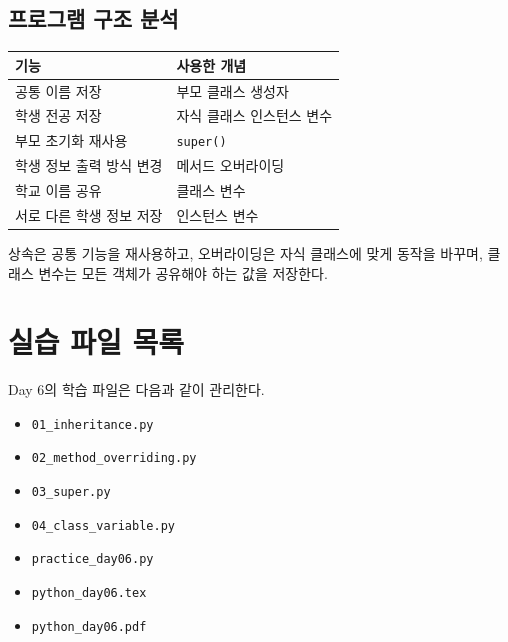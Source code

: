 \documentclass[11pt,a4paper]{article}
\begin{document}
\subsection{프로그램 구조 분석}

\begin{center}
\begin{tabular}{ll}
\toprule
기능 & 사용한 개념 \\
\midrule
공통 이름 저장 & 부모 클래스 생성자 \\
학생 전공 저장 & 자식 클래스 인스턴스 변수 \\
부모 초기화 재사용 & \texttt{super()} \\
학생 정보 출력 방식 변경 & 메서드 오버라이딩 \\
학교 이름 공유 & 클래스 변수 \\
서로 다른 학생 정보 저장 & 인스턴스 변수 \\
\bottomrule
\end{tabular}
\end{center}

\begin{importantbox}
상속은 공통 기능을 재사용하고, 오버라이딩은 자식 클래스에 맞게 동작을 바꾸며, 클래스 변수는 모든 객체가 공유해야 하는 값을 저장한다.
\end{importantbox}

\section{실습 파일 목록}

\begin{practicebox}
Day 6의 학습 파일은 다음과 같이 관리한다.
\begin{itemize}[leftmargin=1.5em]
    \item \texttt{01\_inheritance.py}
    \item \texttt{02\_method\_overriding.py}
    \item \texttt{03\_super.py}
    \item \texttt{04\_class\_variable.py}
    \item \texttt{practice\_day06.py}
    \item \texttt{python\_day06.tex}
    \item \texttt{python\_day06.pdf}
\end{itemize}
\end{practicebox}

\end{document}

